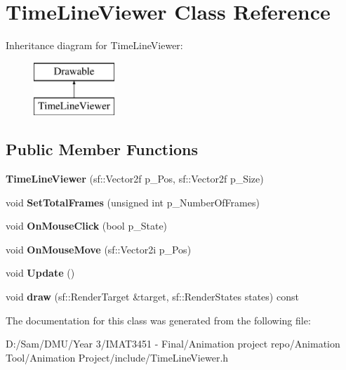 \hypertarget{class_time_line_viewer}{}\section{Time\+Line\+Viewer Class Reference}
\label{class_time_line_viewer}
Inheritance diagram for Time\+Line\+Viewer\+:\begin{figure}[H]
\begin{center}
\leavevmode
\includegraphics[height=2.000000cm]{class_time_line_viewer}
\end{center}
\end{figure}
\subsection*{Public Member Functions}
\begin{DoxyCompactItemize}
\item 
\mbox{\label{class_time_line_viewer_a9a411e81c5399f73d383b9166e113f26}} 
{\bfseries Time\+Line\+Viewer} (sf\+::\+Vector2f p\+\_\+\+Pos, sf\+::\+Vector2f p\+\_\+\+Size)
\item 
\mbox{\label{class_time_line_viewer_a408245f35ad6afe20ab06f0affe95c90}} 
void {\bfseries Set\+Total\+Frames} (unsigned int p\+\_\+\+Number\+Of\+Frames)
\item 
\mbox{\label{class_time_line_viewer_a99c49e442d49585fcec4f17361a54b02}} 
void {\bfseries On\+Mouse\+Click} (bool p\+\_\+\+State)
\item 
\mbox{\label{class_time_line_viewer_a1dbe935d865141b276abf3202b77c4c2}} 
void {\bfseries On\+Mouse\+Move} (sf\+::\+Vector2i p\+\_\+\+Pos)
\item 
\mbox{\label{class_time_line_viewer_a3bcb578ec9bdddfe98d9bb367bcc11e8}} 
void {\bfseries Update} ()
\item 
\mbox{\label{class_time_line_viewer_a9d9fbe5a0080fa3207a65cc58c0c5267}} 
void {\bfseries draw} (sf\+::\+Render\+Target \&target, sf\+::\+Render\+States states) const
\end{DoxyCompactItemize}


The documentation for this class was generated from the following file\+:\begin{DoxyCompactItemize}
\item 
D\+:/\+Sam/\+D\+M\+U/\+Year 3/\+I\+M\+A\+T3451 -\/ Final/\+Animation project repo/\+Animation Tool/\+Animation Project/include/Time\+Line\+Viewer.\+h\end{DoxyCompactItemize}
